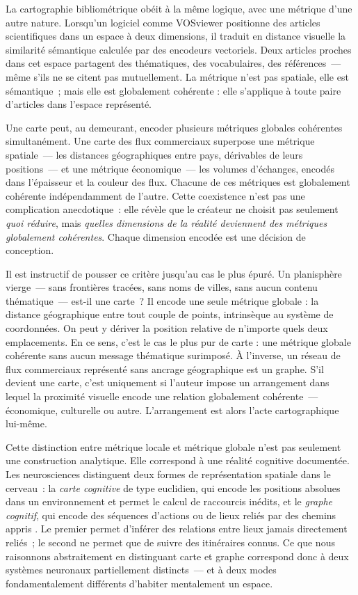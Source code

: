 La cartographie bibliométrique obéit à la même logique, avec une métrique d'une autre
nature. Lorsqu'un logiciel comme VOSviewer positionne des articles scientifiques
dans un espace à deux dimensions, il traduit en distance visuelle la similarité sémantique
calculée par des encodeurs vectoriels. Deux articles proches dans cet espace
partagent des thématiques, des vocabulaires, des références~--- même s'ils ne se
citent pas mutuellement. La métrique n'est pas spatiale, elle est sémantique~;
mais elle est globalement cohérente : elle s'applique à toute paire d'articles
dans l'espace représenté.

Une carte peut, au demeurant, encoder plusieurs métriques globales cohérentes
simultanément. Une carte des flux commerciaux superpose une métrique spatiale~---
les distances géographiques entre pays, dérivables de leurs positions~--- et une
métrique économique~--- les volumes d'échanges, encodés dans l'épaisseur et la couleur
des flux. Chacune de ces métriques est globalement cohérente indépendamment de l'autre.
Cette coexistence n'est pas une complication anecdotique~: elle révèle que le créateur
ne choisit pas seulement \emph{quoi réduire}, mais \emph{quelles dimensions de
la réalité deviennent des métriques globalement cohérentes}. Chaque dimension encodée
est une décision de conception.

Il est instructif de pousser ce critère jusqu'au cas le plus épuré. Un
planisphère vierge~--- sans frontières tracées, sans noms de villes, sans aucun
contenu thématique~--- est-il une carte~? Il encode une seule métrique globale :
la distance géographique entre tout couple de points, intrinsèque au système de coordonnées.
On peut y dériver la position relative de n'importe quels deux emplacements. En ce
sens, c'est le cas le plus pur de carte : une métrique globale cohérente sans
aucun message thématique surimposé. À l'inverse, un réseau de flux commerciaux
représenté sans ancrage géographique est un graphe. S'il devient une carte, c'est
uniquement si l'auteur impose un arrangement dans lequel la proximité visuelle
encode une relation globalement cohérente~--- économique, culturelle ou autre. L'arrangement
est alors l'acte cartographique lui-même.

Cette distinction entre métrique locale et métrique globale n'est pas seulement
une construction analytique. Elle correspond à une réalité cognitive documentée.
Les neurosciences distinguent deux formes de représentation spatiale dans le
cerveau~: la \emph{carte cognitive} de type euclidien, qui encode les positions
absolues dans un environnement et permet le calcul de raccourcis inédits, et le \emph{graphe
cognitif}, qui encode des séquences d'actions ou de lieux reliés par des chemins
appris \parencite{okeefe1978}. Le premier permet d'inférer des relations entre lieux
jamais directement reliés~; le second ne permet que de suivre des itinéraires connus.
Ce que nous raisonnons abstraitement en distinguant carte et graphe correspond
donc à deux systèmes neuronaux partiellement distincts~--- et à deux modes
fondamentalement différents d'habiter mentalement un espace.

